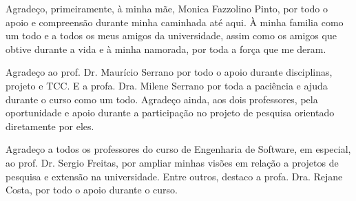 \begin{agradecimentos}

Agradeço, primeiramente, à minha mãe, Monica Fazzolino Pinto, por todo o apoio e compreensão durante minha caminhada até aqui. À minha familia como um todo e a todos os meus amigos da universidade, assim como os amigos que obtive durante a vida e à minha namorada, por toda a força que me deram. 

Agradeço ao prof. Dr. Maurício Serrano por todo o apoio durante disciplinas, projeto e TCC. E a profa. Dra. Milene Serrano por toda a paciência e ajuda durante o curso como um todo. Agradeço ainda, aos dois professores, pela oportunidade e apoio durante a participação no projeto de pesquisa orientado diretamente por eles.

Agradeço a todos os professores do curso de Engenharia de Software, em especial, ao prof. Dr. Sergio Freitas, por ampliar minhas visões em relação a projetos de pesquisa e extensão na universidade. Entre outros, destaco a profa. Dra. Rejane Costa, por todo o apoio durante o curso.

\end{agradecimentos}
